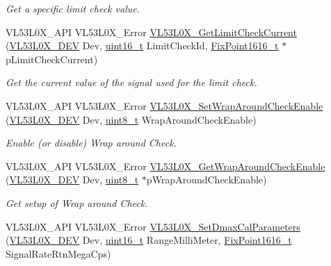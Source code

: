 \begin{DoxyCompactItemize}
\begin{DoxyCompactList}\small\item\em Get a specific limit check value. \end{DoxyCompactList}\item 
V\+L53\+L0\+X\+\_\+\+A\+PI V\+L53\+L0\+X\+\_\+\+Error \hyperlink{group__VL53L0X__parameters__group_ga5eba639cd2fe07d87a44f372b8c92e33}{V\+L53\+L0\+X\+\_\+\+Get\+Limit\+Check\+Current} (\hyperlink{group__VL53L0X__platform__group_ga2d6405308b1dd524b462f1b8fb97d167}{V\+L53\+L0\+X\+\_\+\+D\+EV} Dev, \hyperlink{vl53l0x__types_8h_a273cf69d639a59973b6019625df33e30}{uint16\+\_\+t} Limit\+Check\+Id, \hyperlink{vl53l0x__types_8h_afb910790161809fc76e1a274a6349384}{Fix\+Point1616\+\_\+t} $\ast$p\+Limit\+Check\+Current)
\begin{DoxyCompactList}\small\item\em Get the current value of the signal used for the limit check. \end{DoxyCompactList}\item 
V\+L53\+L0\+X\+\_\+\+A\+PI V\+L53\+L0\+X\+\_\+\+Error \hyperlink{group__VL53L0X__parameters__group_ga2ccb1408fe78f038ad34ffe5ab29cd39}{V\+L53\+L0\+X\+\_\+\+Set\+Wrap\+Around\+Check\+Enable} (\hyperlink{group__VL53L0X__platform__group_ga2d6405308b1dd524b462f1b8fb97d167}{V\+L53\+L0\+X\+\_\+\+D\+EV} Dev, \hyperlink{vl53l0x__types_8h_aba7bc1797add20fe3efdf37ced1182c5}{uint8\+\_\+t} Wrap\+Around\+Check\+Enable)
\begin{DoxyCompactList}\small\item\em Enable (or disable) Wrap around Check. \end{DoxyCompactList}\item 
V\+L53\+L0\+X\+\_\+\+A\+PI V\+L53\+L0\+X\+\_\+\+Error \hyperlink{group__VL53L0X__parameters__group_ga06cb130fc71a8c207d60af069b062725}{V\+L53\+L0\+X\+\_\+\+Get\+Wrap\+Around\+Check\+Enable} (\hyperlink{group__VL53L0X__platform__group_ga2d6405308b1dd524b462f1b8fb97d167}{V\+L53\+L0\+X\+\_\+\+D\+EV} Dev, \hyperlink{vl53l0x__types_8h_aba7bc1797add20fe3efdf37ced1182c5}{uint8\+\_\+t} $\ast$p\+Wrap\+Around\+Check\+Enable)
\begin{DoxyCompactList}\small\item\em Get setup of Wrap around Check. \end{DoxyCompactList}\item 
V\+L53\+L0\+X\+\_\+\+A\+PI V\+L53\+L0\+X\+\_\+\+Error \hyperlink{group__VL53L0X__parameters__group_ga3cf3ba12ba6b6db8ac0cfc6e756b87c1}{V\+L53\+L0\+X\+\_\+\+Set\+Dmax\+Cal\+Parameters} (\hyperlink{group__VL53L0X__platform__group_ga2d6405308b1dd524b462f1b8fb97d167}{V\+L53\+L0\+X\+\_\+\+D\+EV} Dev, \hyperlink{vl53l0x__types_8h_a273cf69d639a59973b6019625df33e30}{uint16\+\_\+t} Range\+Milli\+Meter, \hyperlink{vl53l0x__types_8h_afb910790161809fc76e1a274a6349384}{Fix\+Point1616\+\_\+t} Signal\+Rate\+Rtn\+Mega\+Cps)

\end{DoxyCompactItemize}
